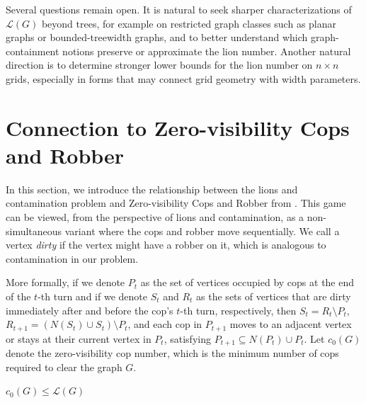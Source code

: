 \documentclass[a4paper,UKenglish,cleveref, autoref, thm-restate]{lipics-v2021}
\begin{document}
Several questions remain open. It is natural to seek sharper characterizations of \(\mathcal{L}(G)\) beyond trees, for example on restricted graph classes such as planar graphs or bounded-treewidth graphs, and to better understand which graph-containment notions preserve or approximate the lion number. Another natural direction is to determine stronger lower bounds for the lion number on \(n\times n\) grids, especially in forms that may connect grid geometry with width parameters.








\appendix

\section{Connection to Zero-visibility Cops and Robber}\label{sec:appendix_zero}
In this section, we introduce the relationship between the lions and contamination problem and Zero-visibility Cops and Robber from \cite{dereniowski2015zero}.
This game can be viewed, from the perspective of lions and contamination, as a non-simultaneous variant where the cops and robber move sequentially. We call a vertex \emph{dirty} if the vertex might have a robber on it, which is analogous to contamination in our problem.

More formally, if we denote $P_t$ as the set of vertices occupied by cops at the end of the $t$-th turn and if we denote $S_t$ and $R_t$ as the sets of vertices that are dirty immediately after and before the cop's $t$-th turn, respectively, then $S_t=R_t\setminus P_t$, $R_{t+1}=(N(S_t)\cup S_t)\setminus P_t$, and each cop in $P_{t+1}$ moves to an adjacent vertex or stays at their current vertex in $P_t$, satisfying $P_{t+1}\subseteq N(P_t)\cup P_t$. Let $c_0(G)$ denote the zero-visibility cop number, which is the minimum number of cops required to clear the graph $G$.

\begin{lemma}\label{lemma:cop_lower_bound}
$c_0(G) \le \mathcal{L}(G)$
\end{lemma}
\end{document}
